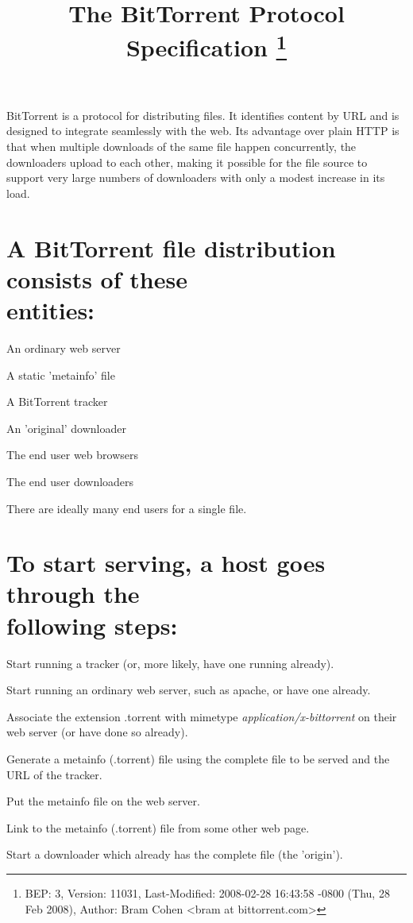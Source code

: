\documentclass{article}
\begin{document}
\title{
  The BitTorrent Protocol Specification
  \footnote{
    BEP: 3, Version:  11031, Last-Modified: 2008-02-28 16:43:58 -0800 (Thu, 28 Feb 2008),
    Author: Bram Cohen  <bram at bittorrent.com>
  }
}
\maketitle
\tableofcontents
\pagebreak

\setlength{\parskip}{1ex plus 0.5ex minus 0.2ex}

BitTorrent is a protocol for distributing files. It identifies content by URL and is designed to integrate seamlessly with the web. Its advantage over plain HTTP is that when multiple downloads of the same file happen concurrently, the downloaders upload to each other, making it possible for the file source to support very large numbers of downloaders with only a modest increase in its load.

{\section{A BitTorrent file distribution consists of these \\ entities:}}

{\begin{itemize}
  {\item An ordinary web server}
  {\item A static 'metainfo' file}
  {\item A BitTorrent tracker}
  {\item An 'original' downloader}
  {\item The end user web browsers}
  {\item The end user downloaders}
\end{itemize}}

There are ideally many end users for a single file.

{\section{To start serving, a host goes through the \\ following steps:}}
{\begin{enumerate}
  {\item Start running a tracker (or, more likely, have one running already).}
  {\item Start running an ordinary web server, such as apache, or have one already.}
  {\item Associate the extension .torrent with mimetype {\mbox{\it application/x-bittorrent}} on their web server (or have done so already).}
  {\item Generate a metainfo (.torrent) file using the complete file to be served and the URL of the tracker.}
  {\item Put the metainfo file on the web server.}
  {\item Link to the metainfo (.torrent) file from some other web page.}
  {\item Start a downloader which already has the complete file (the 'origin').}
\end{enumerate}}
\end{document}
